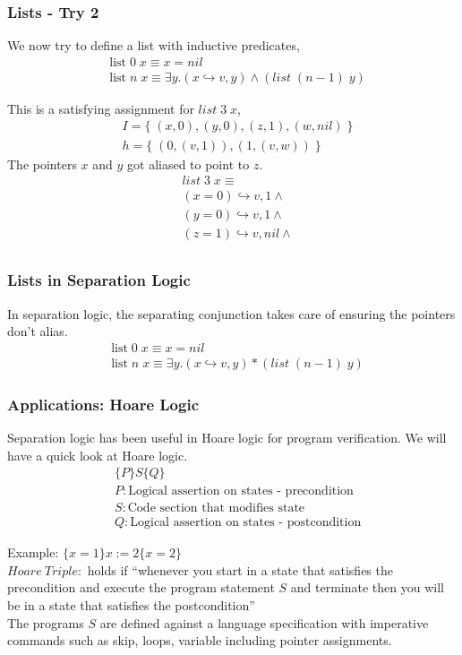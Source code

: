 \documentclass{beamer}
\newcommand{\mscmt}[1]{{\color{blue} [Srivas: {#1}]}}
\begin{document}
\begin{frame}
\frametitle{Lists - Try 2}
We now try to define a list with inductive predicates,
\begin{align*}
    & \textrm{list} \; 0 \; x \equiv x = nil
    \\
    & \textrm{list} \; n \; x \equiv \exists y. (x \hookrightarrow v,y) \land (list \; (n-1) \; y)
\end{align*}

This is a satisfying assignment for $list \; 3 \; x$,
\begin{align*}
    & I = 
    \{\; (x,0), (y,0), (z,1) , (w,nil) \;\}
    \\
    & h = 
    \{\; (0, (v,1)) , (1, (v,w)) \;\}
\end{align*}
The pointers $x$ and $y$ got aliased to point to $z$.
\begin{align*}
    & list \; 3 \; x \equiv \\
    & (x = 0) \hookrightarrow v,1 \land \\
    & (y = 0) \hookrightarrow v,1 \land \\
    & (z = 1) \hookrightarrow v,nil \land \\
\end{align*}
\end{frame}

\begin{frame}
\frametitle{Lists in Separation Logic}
In separation logic, the separating conjunction takes care of ensuring
the pointers don't alias.
\begin{align*}
    & \textrm{list} \; 0 \; x \equiv x = nil
    \\
    & \textrm{list} \; n \; x \equiv \exists y. (x \hookrightarrow v,y) * (list \; (n-1) \; y)
\end{align*}
\end{frame}

\begin{frame}
\frametitle{Applications: Hoare Logic}
Separation logic has been useful in Hoare logic for program verification. We will
have a quick look at Hoare logic. \\

\begin{align*}
    & \{P\}S\{Q\} \\
    & P : \textrm{Logical assertion on states - precondition} \\
    & S : \textrm{Code section that modifies state} \\
    & Q : \textrm{Logical assertion on states - postcondition}
\end{align*}

Example: $\{x = 1\}x := 2\{x = 2\}$ \\[0.15cm]
$Hoare~Triple:$ holds if ``whenever you start in a state that satisfies the precondition and execute the program statement $S$ and terminate then you will be in a state that satisfies the postcondition'' \\[0.15cm]
The programs $S$ are defined against a language specification with 
imperative commands such as skip, loops, variable including pointer assignments.
\end{frame}
\end{document}
